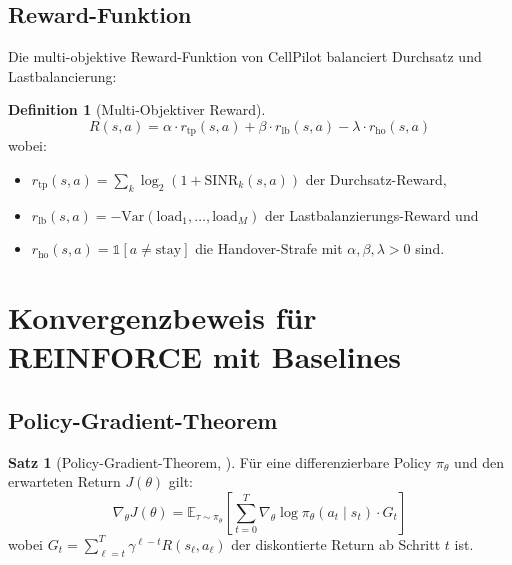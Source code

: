 ﻿\documentclass[a4paper,12pt]{article}
\theoremstyle{definition}
\newtheorem{definition}{Definition}
\newtheorem{satz}{Satz}
\begin{document}
\subsection{Reward-Funktion}

Die multi-objektive Reward-Funktion von CellPilot balanciert Durchsatz und Lastbalancierung:

\begin{definition}[Multi-Objektiver Reward]
  \[
    R(s, a) = \alpha \cdot r_{\mathrm{tp}}(s, a)
            + \beta \cdot r_{\mathrm{lb}}(s, a)
            - \lambda \cdot r_{\mathrm{ho}}(s, a)
  \]
  wobei:
  \begin{itemize}
    \item $r_{\mathrm{tp}}(s,a) = \sum_{k} \log_2(1 + \mathrm{SINR}_k(s,a))$ der Durchsatz-Reward,
    \item $r_{\mathrm{lb}}(s,a) = -\mathrm{Var}(\mathrm{load}_1, \ldots, \mathrm{load}_M)$ der Lastbalanzierungs-Reward und
    \item $r_{\mathrm{ho}}(s,a) = \mathbb{1}[a \neq \mathrm{stay}]$ die Handover-Strafe mit $\alpha, \beta, \lambda > 0$ sind.
  \end{itemize}
\end{definition}

\section{Konvergenzbeweis f\"ur REINFORCE mit Baselines}
\label{sec:reinforce}

\subsection{Policy-Gradient-Theorem}

\begin{satz}[Policy-Gradient-Theorem, \cite{sutton2018}]
  F\"ur eine differenzierbare Policy $\pi_\theta$ und den erwarteten Return $J(\theta)$ gilt:
  \[
    \nabla_\theta J(\theta) =
    \mathbb{E}_{\tau \sim \pi_\theta}\!\left[
      \sum_{t=0}^{T} \nabla_\theta \log \pi_\theta(a_t \mid s_t)
      \cdot G_t
    \right]
  \]
  wobei $G_t = \sum_{\ell=t}^{T} \gamma^{\ell-t} R(s_\ell, a_\ell)$ der diskontierte Return ab Schritt $t$ ist.
\end{satz}
\end{document}
